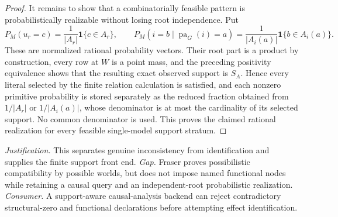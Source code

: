 \documentclass{article}
\begin{document}
\begin{proof}
It remains to show that a combinatorially feasible pattern is probabilistically realizable without losing root independence.  Put
\[
 P_M(u_r=c)=\frac{1}{|A_r|}\mathbf 1\{c\in A_r\},
 \qquad
 P_M(i=b\mid\operatorname{pa}_G(i)=a)
 =\frac{1}{|A_i(a)|}\mathbf 1\{b\in A_i(a)\}.
\]
These are normalized rational probability vectors.  Their root part is a product by construction, every row at \(W\) is a point mass, and the preceding positivity equivalence shows that the resulting exact observed support is \(S_A\).  Hence every literal selected by the finite relation calculation is satisfied, and each nonzero primitive probability is stored separately as the reduced fraction obtained from \(1/|A_r|\) or \(1/|A_i(a)|\), whose denominator is at most the cardinality of its selected support.  No common denominator is used.  This proves the claimed rational realization for every feasible single-model support stratum.
\end{proof}
\par\smallskip\noindent \textit{Justification.} This separates genuine inconsistency from identification and supplies the finite support front end. \textit{Gap.} Fraser proves possibilistic compatibility by possible worlds, but does not impose named functional nodes while retaining a causal query and an independent-root probabilistic realization. \textit{Consumer.} A support-aware causal-analysis backend can reject contradictory structural-zero and functional declarations before attempting effect identification.
\end{document}
